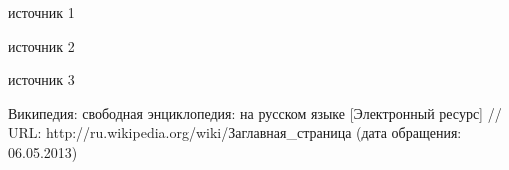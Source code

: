 \begin{thebibliography}{00}

 источник 1

 источник 2

 источник 3

 Википедия: свободная энциклопедия: на русском языке [Электронный ресурс] // URL:  http://ru.wikipedia.org/wiki/Заглавная\_страница  (дата обращения: 06.05.2013)


\end{thebibliography}

